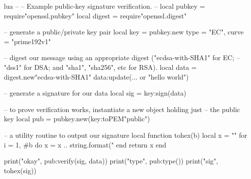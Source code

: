 \documentclass[11pt, oneside]{memoir}
\begin{document}
\begin{example}{lua}
--
-- Example public-key signature verification.
--
local pubkey = require"openssl.pubkey"
local digest = require"openssl.digest"

-- generate a public/private key pair
local key = pubkey.new{ type = "EC", curve = "prime192v1" }

-- digest our message using an appropriate digest ("ecdsa-with-SHA1" for EC;
-- "dss1" for DSA; and "sha1", "sha256", etc for RSA).
local data = digest.new"ecdsa-with-SHA1"
data:update(... or "hello world")

-- generate a signature for our data
local sig = key:sign(data)

-- to prove verification works, instantiate a new object holding just
-- the public key
local pub = pubkey.new(key:toPEM"public")

-- a utility routine to output our signature
local function tohex(b)
	local x = ""
	for i = 1, #b do
		x = x .. string.format("%
	end
	return x
end

print("okay", pub:verify(sig, data))
print("type", pub:type())
print("sig", tohex(sig))
\end{example}



\appendix
\printindex
\end{document}
